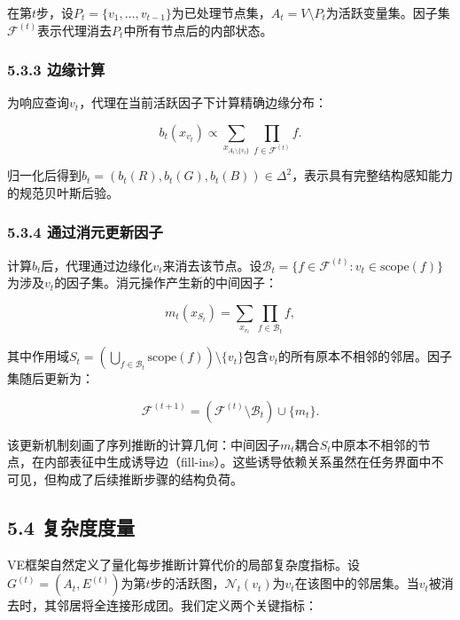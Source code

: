在第$t$步，设$P_t=\{v_1,\ldots,v_{t-1}\}$为已处理节点集，$A_t=V\setminus P_t$为活跃变量集。因子集$\mathcal{F}^{(t)}$表示代理消去$P_t$中所有节点后的内部状态。

\subsubsection*{5.3.3 边缘计算}

为响应查询$v_t$，代理在当前活跃因子下计算精确边缘分布：

\begin{equation*}
b_t(x_{v_t})\propto\sum_{x_{A_t\setminus\{v_t\}}}\prod_{f\in\mathcal{F}^{(t)}}f.
\end{equation*}

归一化后得到$b_t=(b_t(R),b_t(G),b_t(B))\in\Delta^2$，表示具有完整结构感知能力的规范贝叶斯后验。

\subsubsection*{5.3.4 通过消元更新因子}

计算$b_t$后，代理通过边缘化$v_t$来消去该节点。设$\mathcal{B}_t=\{f\in\mathcal{F}^{(t)}:v_t\in\text{scope}(f)\}$为涉及$v_t$的因子集。消元操作产生新的中间因子：

\begin{equation*}
m_t(x_{S_t})=\sum_{x_{v_t}}\prod_{f\in\mathcal{B}_t}f,
\end{equation*}

其中作用域$S_t=\left(\bigcup_{f\in\mathcal{B}_t}\text{scope}(f)\right)\setminus\{v_t\}$包含$v_t$的所有原本不相邻的邻居。因子集随后更新为：

\begin{equation*}
\mathcal{F}^{(t+1)}=\left(\mathcal{F}^{(t)}\setminus\mathcal{B}_t\right)\cup\{m_t\}.
\end{equation*}

该更新机制刻画了序列推断的计算几何：中间因子$m_t$耦合$S_t$中原本不相邻的节点，在内部表征中生成诱导边（fill-ins）。这些诱导依赖关系虽然在任务界面中不可见，但构成了后续推断步骤的结构负荷。

\subsection*{5.4 复杂度度量}

VE框架自然定义了量化每步推断计算代价的局部复杂度指标。设$G^{(t)}=(A_t,E^{(t)})$为第$t$步的活跃图，$\mathcal{N}_t(v_t)$为$v_t$在该图中的邻居集。当$v_t$被消去时，其邻居将全连接形成团。我们定义两个关键指标：

